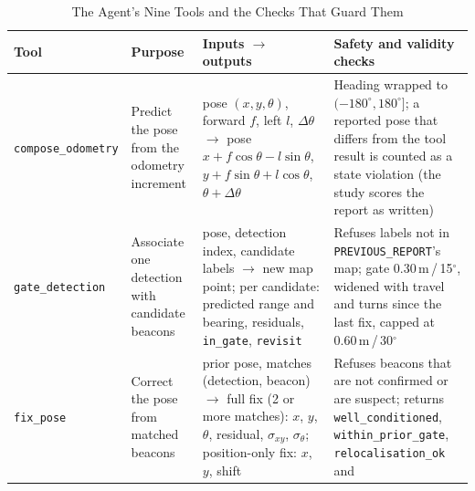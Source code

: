 \begin{table}[!t]
\caption{The Agent's Nine Tools and the Checks That Guard Them}
\label{tab:tools}
\centering
\scriptsize
\renewcommand{\arraystretch}{1.1}
\setlength{\tabcolsep}{3pt}
\begin{tabular}{p{}
                p{}
                p{}
                p{}}
\hline
\raggedright\textbf{Tool} & \raggedright\textbf{Purpose} &
\raggedright\textbf{Inputs $\rightarrow$ outputs} & \raggedright\textbf{Safety and validity checks}
\tabularnewline
\hline
\raggedright\texttt{compose\_odometry} &
\raggedright Predict the pose from the odometry increment &
\raggedright pose $(x,y,\theta)$, forward $f$, left $l$, $\Delta\theta$ $\rightarrow$ pose
$x+f\cos\theta-l\sin\theta$, $y+f\sin\theta+l\cos\theta$, $\theta+\Delta\theta$ &
\raggedright Heading wrapped to $(-180^\circ,180^\circ]$; a reported pose that differs from the
tool result is counted as a state violation (the study scores the report as written)
\tabularnewline
\hline
\raggedright\texttt{gate\_detection} &
\raggedright Associate one detection with candidate beacons &
\raggedright pose, detection index, candidate labels $\rightarrow$ new map point; per candidate:
predicted range and bearing, residuals, \texttt{in\_gate}, \texttt{revisit} &
\raggedright Refuses labels not in \texttt{PREVIOUS\_REPORT}'s map; gate 0.30\,m\,/\,15$^\circ$,
widened with travel and turns since the last fix, capped at 0.60\,m\,/\,30$^\circ$
\tabularnewline
\hline
\raggedright\texttt{fix\_pose} &
\raggedright Correct the pose from matched beacons &
\raggedright prior pose, matches (detection, beacon) $\rightarrow$ full fix (2 or more matches):
$x$, $y$, $\theta$, residual, $\sigma_{xy}$, $\sigma_\theta$; position-only fix: $x$, $y$, shift &
\raggedright Refuses beacons that are not confirmed or are suspect; returns
\texttt{well\_conditioned}, \texttt{within\_prior\_gate}, \texttt{relocalisation\_ok} and

\end{tabular}
\end{table}
